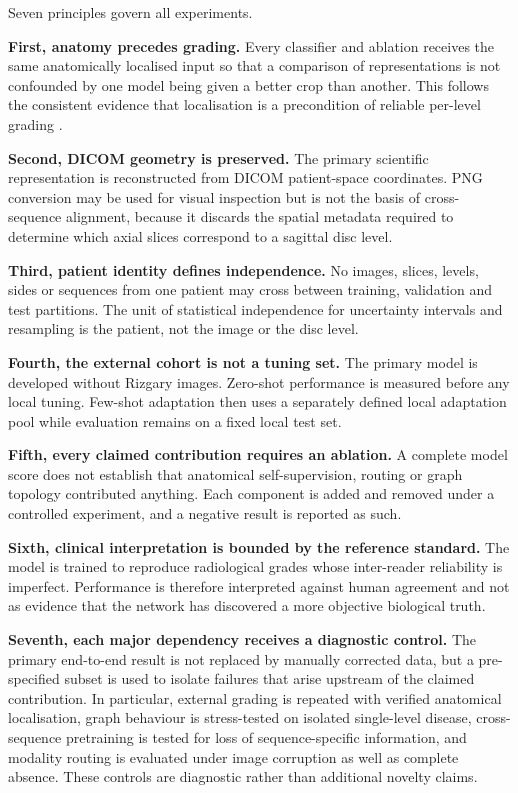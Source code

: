 Seven principles govern all experiments.

\textbf{First, anatomy precedes grading.} Every classifier and ablation receives
the same anatomically localised input so that a comparison of representations is
not confounded by one model being given a better crop than another. This follows
the consistent evidence that localisation is a precondition of reliable
per-level grading \cite{lu2018deepspine,pan2021automatically,batra2025mscan}.

\textbf{Second, DICOM geometry is preserved.} The primary scientific
representation is reconstructed from DICOM patient-space coordinates. PNG
conversion may be used for visual inspection but is not the basis of
cross-sequence alignment, because it discards the spatial metadata required to
determine which axial slices correspond to a sagittal disc level.

\textbf{Third, patient identity defines independence.} No images, slices,
levels, sides or sequences from one patient may cross between training,
validation and test partitions. The unit of statistical independence for
uncertainty intervals and resampling is the patient, not the image or the disc
level.

\textbf{Fourth, the external cohort is not a tuning set.} The primary model is
developed without Rizgary images. Zero-shot performance is measured before any
local tuning. Few-shot adaptation then uses a separately defined local
adaptation pool while evaluation remains on a fixed local test set.

\textbf{Fifth, every claimed contribution requires an ablation.} A complete
model score does not establish that anatomical self-supervision, routing or
graph topology contributed anything. Each component is added and removed under
a controlled experiment, and a negative result is reported as such.

\textbf{Sixth, clinical interpretation is bounded by the reference standard.}
The model is trained to reproduce radiological grades whose inter-reader
reliability is imperfect. Performance is therefore interpreted against human
agreement and not as evidence that the network has discovered a more objective
biological truth.

\textbf{Seventh, each major dependency receives a diagnostic control.} The
primary end-to-end result is not replaced by manually corrected data, but a
pre-specified subset is used to isolate failures that arise upstream of the
claimed contribution. In particular, external grading is repeated with
verified anatomical localisation, graph behaviour is stress-tested on isolated
single-level disease, cross-sequence pretraining is tested for loss of
sequence-specific information, and modality routing is evaluated under image
corruption as well as complete absence. These controls are diagnostic rather
than additional novelty claims.

